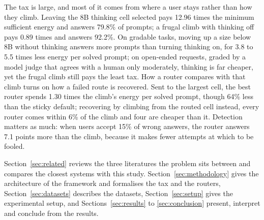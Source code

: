 The tax is large, and most of it comes from where a user stays rather than
how they climb. Leaving the 8B thinking cell selected pays 12.96 times the
minimum sufficient energy and answers 79.8\% of prompts; a frugal climb with
thinking off pays 0.89 times and answers 92.2\%. On gradable tasks, moving up
a size below 8B without thinking answers more prompts than turning thinking
on, for 3.8 to 5.5 times less energy per solved prompt; on open-ended
requests, graded by a model judge that agrees with a human only moderately,
thinking is far cheaper, yet the frugal climb still pays the least tax. How a
router compares with that climb turns on how a failed route is recovered.
Sent to the largest cell, the best router spends 1.30 times the climb's
energy per solved prompt, though 64\% less than the sticky default;
recovering by climbing from the routed cell instead, every router comes
within 6\% of the climb and four are cheaper than it. Detection matters as
much: when users accept 15\% of wrong answers, the router answers 7.1 points
more than the climb, because it makes fewer attempts at which to be fooled.

Section~\ref{sec:related} reviews the three literatures the problem sits
between and compares the closest systems with this study.
Section~\ref{sec:methodology} gives the architecture of the framework and
formalises the tax and the routers, Section~\ref{sec:datasets} describes the
datasets, Section~\ref{sec:setup} gives the experimental setup, and
Sections~\ref{sec:results} to \ref{sec:conclusion} present, interpret and
conclude from the results.

